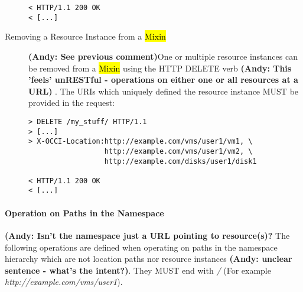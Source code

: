 \documentclass[10pt,a4paper]{article}
\begin{document}
\begin{description}
\begin{verbatim}
< HTTP/1.1 200 OK
< [...]
\end{verbatim}

\item[Removing a Resource Instance from a \hl{Mixin}] 
\textbf{(Andy: See previous comment)}One or multiple
  resource instances can be removed from a \hl{Mixin} using the HTTP
  DELETE verb 
  \textbf{(Andy: This 'feels' unRESTful - operations on either one or all resources at a URL)}
  . The URIs which uniquely defined the resource instance
  MUST be provided in the request:
\begin{verbatim}
> DELETE /my_stuff/ HTTP/1.1
> [...]
> X-OCCI-Location:http://example.com/vms/user1/vm1, \
                  http://example.com/vms/user1/vm2, \
                  http://example.com/disks/user1/disk1

< HTTP/1.1 200 OK
< [...]
\end{verbatim}
\end{description}

\paragraph{Operation on Paths in the Namespace}
\textbf{(Andy: Isn't the namespace just a URL pointing to resource(s)?}
The following operations are defined when operating on paths in the
namespace hierarchy which are not location paths nor resource
instances \textbf{(Andy: unclear sentence - what's the intent?)}. 
They MUST end with \emph{/} (For example
\emph{http://example.com/vms/user1}).
\end{document}
